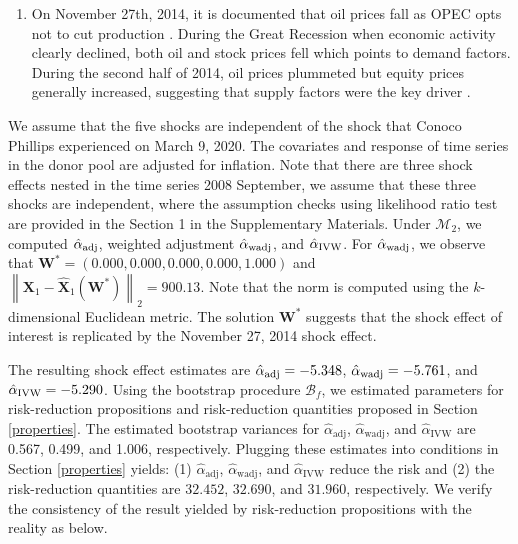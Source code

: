 \documentclass[11pt]{article}
\def\mbf#1{\mathbf{#1}} %
\def\mc#1{\mathcal{#1}} %
\newcommand{\norm}[1]{\left\lVert#1\right\rVert} %
\theoremstyle{definition}
\begin{document}
\begin{enumerate}
\begin{enumerate}
  \item On November 27th, 2014, it is documented that oil prices fall as OPEC opts not to cut production \citep{huppmann2015opec}. During the Great Recession when economic activity clearly declined, both oil and stock prices fell which points to demand factors. During the second half of 2014, oil prices plummeted but equity prices generally increased, suggesting that supply factors were the key driver \citep[Page 19]{baffes2015great}. 
  \end{enumerate}
\end{enumerate}


We assume that the five shocks are independent of the shock that Conoco Phillips experienced on March 9, 2020. The covariates and response of time series in the donor pool are adjusted for inflation. Note that there are three shock effects nested in the time series 2008 September, we assume that these three shocks are independent, where the assumption checks using likelihood ratio test are provided in the Section 1 in the Supplementary Materials. Under $\mc{M}_{2}$, we computed $\hat{\alpha}_{\rm adj}$, weighted adjustment $\hat{\alpha}_{\rm wadj}$, and $\hat{\alpha}_{\rm IVW}$. For $\hat{\alpha}_{\rm wadj}$, we observe that 
$
  \mathbf{W}^*= (0.000,0.000, 0.000, 0.000, 1.000)
$
and 
$
  \norm{\mbf{X}_1-\hat{\mbf{X}}_1(\mbf{W}^*)}_{2} = 900.13.
$
Note that the norm is computed using the $k$-dimensional Euclidean metric. The solution $\mathbf{W}^*$ suggests that the shock effect of interest is replicated by the November 27, 2014 shock effect. 


The resulting shock effect estimates are $\hat{\alpha}_{\rm adj}=-5.348$, $\hat{\alpha}_{\rm wadj}= -5.761$, and $\hat{\alpha}_{\rm IVW}=-5.290$. Using the bootstrap procedure $\mc{B}_f$, we estimated parameters for risk-reduction propositions and risk-reduction quantities proposed in  Section \ref{properties}. The estimated bootstrap variances for $\hat{\alpha}_{\text{adj}}$, $\hat{\alpha}_{\text{wadj}}$, and $\hat{\alpha}_{\text{IVW}}$  are 0.567, 0.499, and 1.006, respectively. Plugging these estimates into conditions in Section \ref{properties} yields: (1) $\hat{\alpha}_{\text{adj}}$, $\hat{\alpha}_{\text{wadj}}$, and $\hat{\alpha}_{\text{IVW}}$  reduce the risk and (2) the risk-reduction quantities are $32.452$, $32.690$, and $31.960$, respectively. We verify the consistency of the result yielded by risk-reduction propositions with the reality as below.
\end{document}
